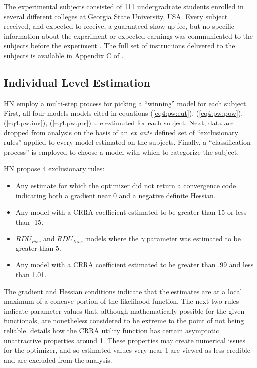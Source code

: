 \documentclass[../main.tex]{subfiles}
\begin{document}
The experimental subjects consisted of 111 undergraduate students enrolled in several different colleges at Georgia State University, USA.
Every subject received, and expected to receive, a guaranteed  show up fee, but no specific information about the experiment or expected earnings was communicated to the subjects before the experiment \parencite[98]{Harrison2016}.
The full set of instructions delivered to the subjects is available in Appendix C of \textcite{Harrison2016}.

\subsection{Individual Level Estimation}
\label{sec4:ILE}

HN employ a multi-step process for picking a \enquote{winning} model for each subject.
First, all four models models cited in equations (\ref{eq4:pw:eut}), (\ref{eq4:pw:pow}), (\ref{eq4:pw:inv}), (\ref{eq4:pw:pre}) are estimated for each subject.
Next, data are dropped from analysis on the basis of an \textit{ex ante} defined set of \enquote{exclusionary rules} applied to every model estimated on the subjects.
Finally, a \enquote{classification process} is employed to choose a model with which to categorize the subject.

HN propose 4 exclusionary rules:
\begin{itemize}
	\item Any estimate for which the optimizer did not return a convergence code indicating both a gradient near 0 and a negative definite Hessian.
	\item Any model with a CRRA coefficient estimated to be greater than 15 or less than -15.
	\item $\mathit{RDU_{Pow}}$ and $\mathit{RDU_{Invs}}$ models where the $\gamma$ parameter was estimated to be greater than 5.
	\item Any model with a CRRA coefficient estimated to be greater than .99 and less than 1.01.
\end{itemize}

\noindent The gradient and Hessian conditions indicate that the estimates are at a local maximum of a concave portion of the likelihood function.
The next two rules indicate parameter values that, although mathematically possible for the given functionals, are nonetheless considered to be extreme to the point of not being reliable.
\textcite{Wakker2008} details how the CRRA utility function has certain asymptotic unattractive properties around 1.
These properties may create numerical issues for the optimizer, and so estimated values very near 1 are viewed as less credible and are excluded from the analysis.
\end{document}

